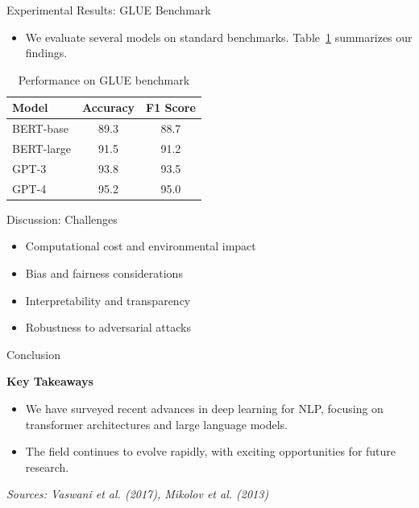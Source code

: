 \documentclass[aspectratio=169]{beamer}
\begin{document}
\begin{frame}{Experimental Results: GLUE Benchmark}
\begin{itemize}
    \item We evaluate several models on standard benchmarks. Table~\ref{tab:results} summarizes our findings.
\end{itemize}

\begin{table}[htbp]
\centering
\caption{Performance on GLUE benchmark}
\small
\setlength{\tabcolsep}{3pt}
\renewcommand{\arraystretch}{0.8}
\begin{tabular}{|l|c|c|}
\hline
Model & Accuracy & F1 Score \\
\hline
BERT-base & 89.3 & 88.7 \\
BERT-large & 91.5 & 91.2 \\
GPT-3 & 93.8 & 93.5 \\
GPT-4 & 95.2 & 95.0 \\
\hline
\end{tabular}
\label{tab:results}
\end{table}
\end{frame}

\begin{frame}{Discussion: Challenges}
\begin{itemize}
  \item Computational cost and environmental impact
  \item Bias and fairness considerations
  \item Interpretability and transparency
  \item Robustness to adversarial attacks
\end{itemize}
\end{frame}

\begin{frame}{Conclusion}
\begin{center}
\large
\textbf{Key Takeaways}
\end{center}

\vspace{1cm} %

\begin{itemize}
    \item We have surveyed recent advances in deep learning for NLP, focusing on transformer architectures and large language models.
    \item The field continues to evolve rapidly, with exciting opportunities for future research.
\end{itemize}

\vspace{1cm} %

\small
\textit{Sources: Vaswani et al. (2017), Mikolov et al. (2013)}
\end{frame}
\end{document}
